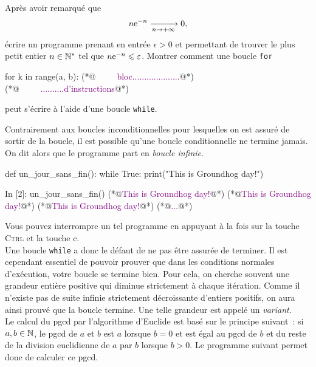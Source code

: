 \documentclass{magnolia}
\begin{document}
\begin{exos}
\exo Après avoir remarqué que
  \[n {\rm e}^{-n}\xrightarrow[n\rightarrow +\infty]{}0,\]
  écrire un programme prenant en entrée $\epsilon>0$ et permettant de trouver le plus petit entier $n\in{\mathbb{N}^*}$ tel que
  $n {\rm e}^{-n} \leqslant \varepsilon$.
\exo Montrer comment une boucle \verb_for_
\begin{pythoncode}
for k in range(a, b):
(*@\textcolor{purple}{\ \ \ \ \ bloc....................}@*)
(*@\textcolor{purple}{\ \ \ \ \ ..........d'instructions}@*)
\end{pythoncode}
peut s'écrire à l'aide d'une boucle \verb_while_.
\end{exos}
\vspace{2ex}
Contrairement aux boucles inconditionnelles pour lesquelles on est assuré
de sortir de la boucle, il est possible qu'une boucle conditionnelle ne termine jamais.
On dit alors que le programme part en \emph{boucle infinie}. 

\begin{pythoncodeline}
def un_jour_sans_fin():
    while True:
        print("This is Groundhog day!")
\end{pythoncodeline}

\begin{pythoncode}
In [2]: un_jour_sans_fin()
(*@\textcolor{purple}{This is Groundhog day!}@*)
(*@\textcolor{purple}{This is Groundhog day!}@*)
(*@\textcolor{purple}{This is Groundhog day!}@*)
(*@\textcolor{purple}{...}@*)
\end{pythoncode}
\noindent Vous pouvez interrompre un tel programme en appuyant à la fois sur la touche \og \textsc{Ctrl} \fg et la touche \og c\fg.\\

Une boucle \verb_while_ a donc le défaut de ne pas être assurée de terminer. Il est
cependant essentiel de pouvoir prouver que dans les conditions normales d'exécution, votre boucle se termine bien. Pour cela,
on cherche souvent une grandeur entière positive qui diminue strictement à chaque itération. Comme
il n'existe pas de suite infinie strictement décroissante d'entiers positifs, on aura
ainsi prouvé que la boucle termine. Une telle grandeur est appelé un \emph{variant}.\\

Le calcul du pgcd par l'algorithme d'Euclide est basé sur le principe suivant~:
si $a,b\in\mathbb{N}$, le pgcd de $a$ et $b$ est $a$ lorsque $b=0$ et est égal au pgcd de
$b$ et du reste de la division euclidienne de $a$ par $b$ lorsque $b>0$. Le programme
suivant permet donc de calculer ce pgcd.
\end{document}
